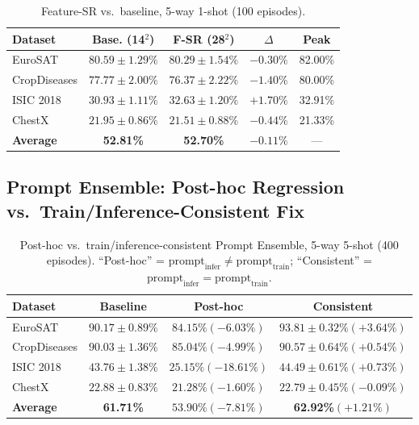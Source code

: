\documentclass[conference]{IEEEtran}
\begin{document}
\begin{table}[t]
\centering
\caption{Feature-SR vs.\ baseline, 5-way 1-shot (100 episodes).}
\label{tab:fsr1shot}
\footnotesize
\setlength{\tabcolsep}{3.5pt}
\begin{tabular}{lcccc}
\toprule
Dataset & Base. (14$^2$) & F-SR (28$^2$) & $\Delta$ & Peak \\
\midrule
EuroSAT       & $\mathbf{80.59{\pm}1.29\%}$ & $80.29{\pm}1.54\%$ & $-0.30\%$ & 82.00\% \\
CropDiseases  & $\mathbf{77.77{\pm}2.00\%}$ & $76.37{\pm}2.22\%$ & $-1.40\%$ & 80.00\% \\
ISIC 2018     & $30.93{\pm}1.11\%$ & $\mathbf{32.63{\pm}1.20\%}$ & $\mathbf{+1.70\%}$ & 32.91\% \\
ChestX        & $\mathbf{21.95{\pm}0.86\%}$ & $21.51{\pm}0.88\%$ & $-0.44\%$ & 21.33\% \\
\midrule
\textbf{Average} & \textbf{52.81\%} & \textbf{52.70\%} & $-0.11\%$ & --- \\
\bottomrule
\end{tabular}
\end{table}

\subsection{Prompt Ensemble: Post-hoc Regression vs.\ Train/Inference-Consistent Fix} \label{sec:promptresults}

\begin{table}[t]
\centering
\caption{Post-hoc vs.\ train/inference-consistent Prompt Ensemble, 5-way 5-shot (400 episodes). ``Post-hoc'' = $\text{prompt}_{\text{infer}} \neq \text{prompt}_{\text{train}}$; ``Consistent'' = $\text{prompt}_{\text{infer}} = \text{prompt}_{\text{train}}$.}
\label{tab:promptensemble}
\scriptsize
\setlength{\tabcolsep}{3pt}
\begin{tabular}{lccc}
\toprule
Dataset & Baseline & Post-hoc & Consistent \\
\midrule
EuroSAT      & $90.17{\pm}0.89\%$ & $84.15\%(-6.03\%)$  & $\mathbf{93.81{\pm}0.32\%}(+3.64\%)$ \\
CropDiseases & $90.03{\pm}1.36\%$ & $85.04\%(-4.99\%)$  & $\mathbf{90.57{\pm}0.64\%}(+0.54\%)$ \\
ISIC 2018    & $43.76{\pm}1.38\%$ & $25.15\%(-18.61\%)$ & $\mathbf{44.49{\pm}0.61\%}(+0.73\%)$ \\
ChestX       & $22.88{\pm}0.83\%$ & $21.28\%(-1.60\%)$  & $22.79{\pm}0.45\%(-0.09\%)$ \\
\midrule
\textbf{Average} & \textbf{61.71\%} & $53.90\%(-7.81\%)$ & \textbf{62.92\%}$(+1.21\%)$ \\
\bottomrule
\end{tabular}
\end{table}
\end{document}
